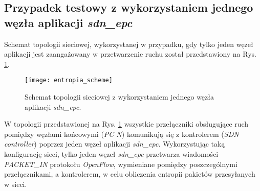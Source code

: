 \subsection{Przypadek testowy z wykorzystaniem jednego węzła aplikacji
  \textit{sdn\_epc}}

Schemat topologii sieciowej, wykorzystanej w przypadku, gdy tylko jeden węzeł
aplikacji jest zaangażowany w przetwarzenie ruchu został przedstawiony na
Rys. \ref{fig:entropia_scheme}.

\begin{figure}[h]
\centering
\texttt{[image: entropia\_scheme]}
\caption{Schemat topologii sieciowej z wykorzystaniem jednego węzła aplikacji
  \textit{sdn\_epc}.}
\label{fig:entropia_scheme}
\end{figure}

W topologii przedstawionej na Rys. \ref{fig:entropia_scheme} wszystkie przełączniki
obsługujące ruch pomiędzy węzłami końcowymi (\textit{PC N}) komunikują się z
kontrolerem (\textit{SDN controller}) poprzez jeden węzeł aplikacji
\textit{sdn\_epc}. Wykorzystując taką konfigurację sieci, tylko jeden węzeł
\textit{sdn\_epc} przetwarza wiadomości \mbox{\textit{PACKET\_IN}} protokołu
\textit{OpenFlow}, wymieniane pomiędzy poszczególnymi przełącznikami, a
kontrolerem, w celu obliczenia entropii pakietów przesyłanych w sieci.
